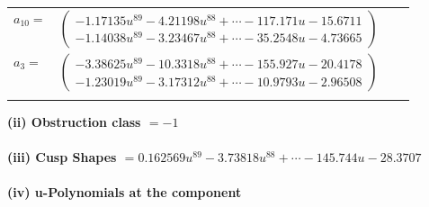 \documentclass[1p]{elsarticle_modified}
\theoremstyle{definition}
\begin{document}
\begin{tabular}{m{7pt} m{180pt} m{7pt} m{180pt} }
\flushright $a_{10}=$&$\begin{pmatrix}-1.17135 u^{89}-4.21198 u^{88}+\cdots-117.171 u-15.6711\\-1.14038 u^{89}-3.23467 u^{88}+\cdots-35.2548 u-4.73665\end{pmatrix}$ \\
\flushright $a_{3}=$&$\begin{pmatrix}-3.38625 u^{89}-10.3318 u^{88}+\cdots-155.927 u-20.4178\\-1.23019 u^{89}-3.17312 u^{88}+\cdots-10.9793 u-2.96508\end{pmatrix}$\\&\end{tabular}
\flushleft \textbf{(ii) Obstruction class $= -1$}\\~\\
\flushleft \textbf{(iii) Cusp Shapes $= 0.162569 u^{89}-3.73818 u^{88}+\cdots-145.744 u-28.3707$}\\~\\
\newpage\renewcommand{\arraystretch}{1}
\flushleft \textbf{(iv) u-Polynomials at the component}\newline \\
\end{document}

